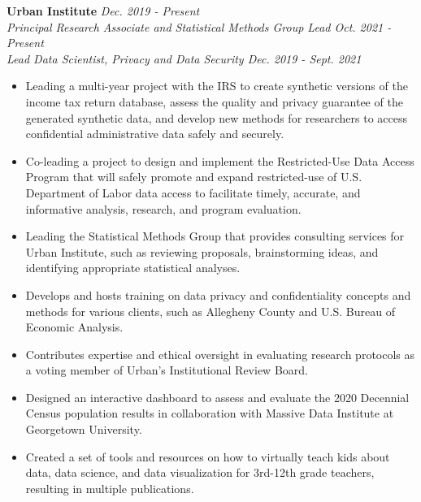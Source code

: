 
\textbf{Urban Institute} \hfill \textit{Dec. 2019 - Present}\\
    \textit{Principal Research Associate and Statistical Methods Group Lead \hfill Oct. 2021 - Present}\\
    \textit{Lead Data Scientist, Privacy and Data Security \hfill Dec. 2019 - Sept. 2021}
    \begin{itemize}
        \item Leading a multi-year project with the IRS to create synthetic versions of the income tax return database, assess the quality and privacy guarantee of the generated synthetic data, and develop new methods for researchers to access confidential administrative data safely and securely.
        \item Co-leading a project to design and implement the Restricted-Use Data Access Program that will safely promote and expand restricted-use of U.S. Department of Labor data access to facilitate timely, accurate, and informative analysis, research, and program evaluation.
        \item Leading the Statistical Methods Group that provides consulting services for Urban Institute, such as reviewing proposals, brainstorming ideas, and identifying appropriate statistical analyses.
        \item Develops and hosts training on data privacy and confidentiality concepts and methods for various clients, such as Allegheny County and U.S. Bureau of Economic Analysis.
        \item Contributes expertise and ethical oversight in evaluating research protocols as a voting member of Urban's Institutional Review Board.
        \item Designed an interactive dashboard to assess and evaluate the 2020 Decennial Census population results in collaboration with Massive Data Institute at Georgetown University.
        \item Created a set of tools and resources on how to virtually teach kids about data, data science, and data visualization for 3rd-12th grade teachers, resulting in multiple publications.
    \end{itemize}

